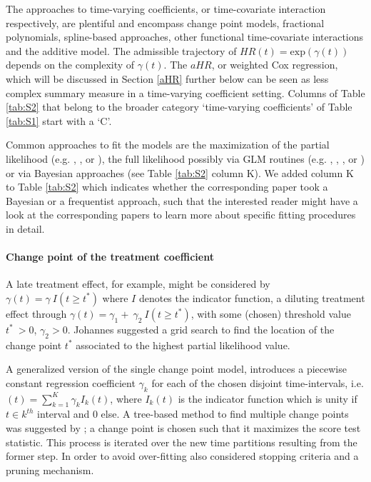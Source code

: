 \noindent 

\noindent The approaches to time-varying coefficients, or time-covariate interaction respectively, are plentiful and encompass change point models, fractional polynomials, spline-based approaches, other functional time-covariate interactions and the additive model. The admissible trajectory of $HR\left(t\right)={\mathrm{exp} (\gamma (t))\ }$ depends on the complexity of $\gamma \left(t\right)$. The $aHR$, or weighted Cox regression, which will be discussed in Section \ref{aHR} further below can be seen as less complex summary measure in a time-varying coefficient setting. Columns of Table \ref{tab:S2} that belong to the broader category `time-varying coefficients' of Table \ref{tab:S1} start with a `C'.

\noindent 

\noindent Common approaches to fit the models are the maximization of the partial likelihood (e.g. \cite{Zhang.2021}, \cite{Brown.2007}, or \cite{Sauerbrei.2007}), the full likelihood possibly via GLM routines (e.g. \cite{Freeman.2022}, \cite{Argyropoulos.2015}, \cite{RodriguezGirondo.2013}, or \cite{Royston.2002}) or via Bayesian approaches (see Table \ref{tab:S2} column K). We added column K to Table \ref{tab:S2} which indicates whether the corresponding paper took a Bayesian or a frequentist approach, such that the interested reader might have a look at the corresponding papers to learn more about specific fitting procedures in detail.

\noindent 


\paragraph{Change point of the treatment coefficient} \label{change point}

\noindent 


\noindent A late treatment effect, for example, might be considered by $\gamma \left(t\right)=\gamma \ I(t\ge t^*)$ where $I$ denotes the indicator function, a diluting treatment effect through $\gamma \left(t\right)={\gamma }_1+\ {\gamma }_2\ I(t\ge t^*)$, with some (chosen) threshold value $t^*\ >0$, ${\gamma }_2>0$. Johannes \cite{Johannes.2007}  suggested a grid search to find the location of the change point $t^*$ associated to the highest partial likelihood value. 

\noindent A generalized version of the single change point model, introduces a piecewise constant regression coefficient ${\gamma }_k$ for each of the chosen disjoint time-intervals, i.e. $\left(t\right)=\sum^K_{k=1}{{\gamma }_k}I_k(t)$, where $I_k(t)$ is the indicator function which is unity if $t\in k^{th}$ interval and $0$ else. A tree-based method to find multiple change points was suggested by \cite{Xu.2002}; a change point is chosen such that it maximizes the score test statistic. This process is iterated over the new time partitions resulting from the former step. In order to avoid over-fitting \cite{Xu.2002} also considered stopping criteria and a pruning mechanism. 


